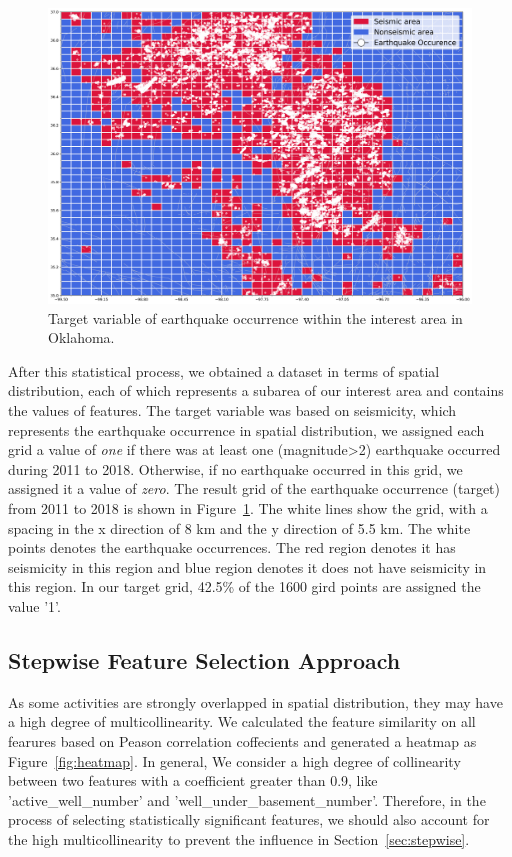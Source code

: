 \documentclass[final-report]{report-template}
\begin{document}
\begin{figure}
    \begin{center}
        \includegraphics[width=1\textwidth]{target_mapping.png}
    \end{center}
    \caption{\label{fig:target_mapping} Target variable of earthquake occurrence within the interest area in Oklahoma.}
\end{figure}
After this statistical process, we obtained a dataset in terms of spatial distribution, each of which represents a subarea of our interest area and contains the values of features.
The target variable was based on seismicity, which represents the earthquake occurrence in spatial distribution, we assigned each grid a value of \textit{one} if there was at least one (magnitude\textgreater2) earthquake occurred during 2011 to 2018. 
Otherwise, if no earthquake occurred in this grid, we assigned it a value of \textit{zero}. The result grid of the earthquake occurrence (target) from 2011 to 2018 is shown in Figure~\ref{fig:target_mapping}. 
The white lines show the grid, with a spacing in the x direction of 8 km and the y direction of 5.5 km. The white points denotes the earthquake occurrences.
The red region denotes it has seismicity in this region and blue region denotes it does not have seismicity in this region. In our target grid, 42.5\% of the 1600 gird points are assigned the value '1'.

\subsection{Stepwise Feature Selection Approach}
\label{sec:SFSA}


As some activities are strongly overlapped in spatial distribution, they may have a high degree of multicollinearity. 
We calculated the feature similarity on all fearures based on Peason correlation coffecients and generated a heatmap as Figure~\ref{fig:heatmap}.
In general, We consider a high degree of collinearity between two features with a coefficient greater than 0.9, like 'active\_well\_number' and 'well\_under\_basement\_number'.
Therefore, in the process of selecting statistically significant features, we should also account for the high multicollinearity to prevent the influence in Section~\ref{sec:stepwise}.
\end{document}
